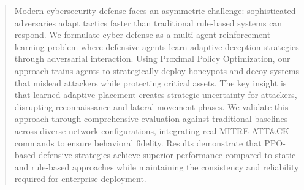 \documentclass[12pt,oneside]{article}
\begin{document}



\tableofcontents
\clearpage  %

\begin{abstract}

\vspace{1em} %

Modern cybersecurity defense faces an asymmetric challenge: sophisticated adversaries adapt tactics faster than traditional rule-based systems can respond. We formulate cyber defense as a multi-agent reinforcement learning problem where defensive agents learn adaptive deception strategies through adversarial interaction. Using Proximal Policy Optimization, our approach trains agents to strategically deploy honeypots and decoy systems that mislead attackers while protecting critical assets. The key insight is that learned adaptive placement creates strategic uncertainty for attackers, disrupting reconnaissance and lateral movement phases. We validate this approach through comprehensive evaluation against traditional baselines across diverse network configurations, integrating real MITRE ATT\&CK commands to ensure behavioral fidelity. Results demonstrate that PPO-based defensive strategies achieve superior performance compared to static and rule-based approaches while maintaining the consistency and reliability required for enterprise deployment.
\end{abstract}

\clearpage

\end{document}
